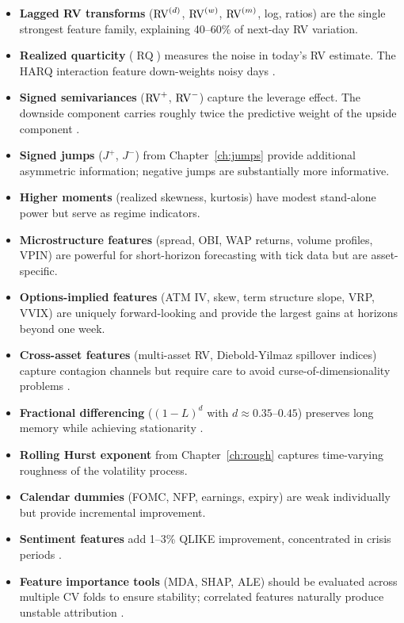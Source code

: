 \begin{itemize}
  \item \textbf{Lagged RV transforms} ($\operatorname{RV}^{(d)}$, $\operatorname{RV}^{(w)}$, $\operatorname{RV}^{(m)}$, log, ratios) are the single strongest feature family, explaining 40--60\% of next-day RV variation.

  \item \textbf{Realized quarticity} ($\operatorname{RQ}$) measures the noise in today's RV estimate. The HARQ interaction feature down-weights noisy days \citep{BollerslevPattonQuaedvlieg2016HARQ}.

  \item \textbf{Signed semivariances} ($\operatorname{RV}^+$, $\operatorname{RV}^-$) capture the leverage effect. The downside component carries roughly twice the predictive weight of the upside component \citep{PattonSheppard2015}.

  \item \textbf{Signed jumps} ($J^+$, $J^-$) from Chapter~\ref{ch:jumps} provide additional asymmetric information; negative jumps are substantially more informative.

  \item \textbf{Higher moments} (realized skewness, kurtosis) have modest stand-alone power but serve as regime indicators.

  \item \textbf{Microstructure features} (spread, OBI, WAP returns, volume profiles, VPIN) are powerful for short-horizon forecasting with tick data but are asset-specific.

  \item \textbf{Options-implied features} (ATM IV, skew, term structure slope, VRP, VVIX) are uniquely forward-looking and provide the largest gains at horizons beyond one week.

  \item \textbf{Cross-asset features} (multi-asset RV, Diebold-Yilmaz spillover indices) capture contagion channels but require care to avoid curse-of-dimensionality problems \citep{DieboldYilmaz2012}.

  \item \textbf{Fractional differencing} ($(1-L)^d$ with $d \approx 0.35$--$0.45$) preserves long memory while achieving stationarity \citep{LopezdePrado2018AFML}.

  \item \textbf{Rolling Hurst exponent} from Chapter~\ref{ch:rough} captures time-varying roughness of the volatility process.

  \item \textbf{Calendar dummies} (FOMC, NFP, earnings, expiry) are weak individually but provide incremental improvement.

  \item \textbf{Sentiment features} add 1--3\% QLIKE improvement, concentrated in crisis periods \citep{AudrinoSignristBallinari2020, RahimikiaZohrenPoon2021}.

  \item \textbf{Feature importance tools} (MDA, SHAP, ALE) should be evaluated across multiple CV folds to ensure stability; correlated features naturally produce unstable attribution \citep{ChristensenSiggaardVeliyev2023}.
\end{itemize}

